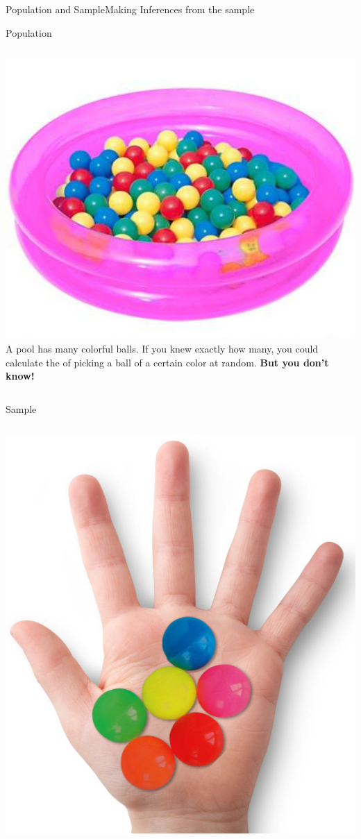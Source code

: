 \begin{frame}{Population and Sample}{Making Inferences from the sample}
  \begin{block}{Population}
    \begin{columns}
      \includegraphics[width=1\textwidth]{../img/ballpool}
      A pool has many colorful balls. If you knew exactly how many, you could calculate the  of picking a ball of a certain color at random. {\bf But you don't know!}
    \end{columns}
  \end{block}
  \begin{block}{Sample}
    \begin{columns}
      \includegraphics[width=1\textwidth]{../img/ballhand}

\end{columns}
\end{block}
\end{frame}

